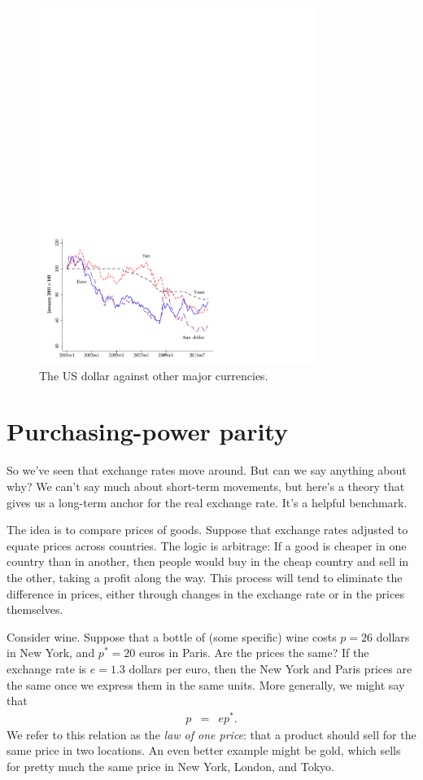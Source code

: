 %
\begin{figure}[h!]
    \caption{The US dollar against other major currencies.}
    \label{fig:exch_rates}
    \centering
    \includegraphics[width=0.8\textwidth]{Figures/exchange.pdf}
\end{figure}
%


\section{Purchasing-power parity}

So we've seen that exchange rates move around.
But can we say anything about why?
We can't say much about short-term movements,
but here's a theory that gives us a long-term anchor
for the real exchange rate.
It's a helpful benchmark.

The idea is to compare prices of goods.
Suppose that exchange rates adjusted to equate prices across countries.
The logic is arbitrage:  If a good is cheaper in one
country than in another, then people would buy in the cheap country
and sell in the other, taking a profit along the way.
This process will tend to eliminate the difference in prices,
either through changes in the exchange rate or in the prices themselves.

Consider wine.
Suppose that a bottle of (some specific) wine costs $p=26$ dollars in New York,
and $p^*=20$ euros in Paris.
Are the prices the same?
If the exchange rate is $e=1.3$ dollars per euro,
then the New York and Paris prices are the same once we express them
in the same units.
More generally, we might say that
\begin{eqnarray*}
    p &=& e p^* .
\end{eqnarray*}
We refer to this relation as the {\it law of one price\/}:
that a product should sell for the same price in two locations.
An even better example might be gold,
which sells for pretty much the same price in
New York, London, and Tokyo.

